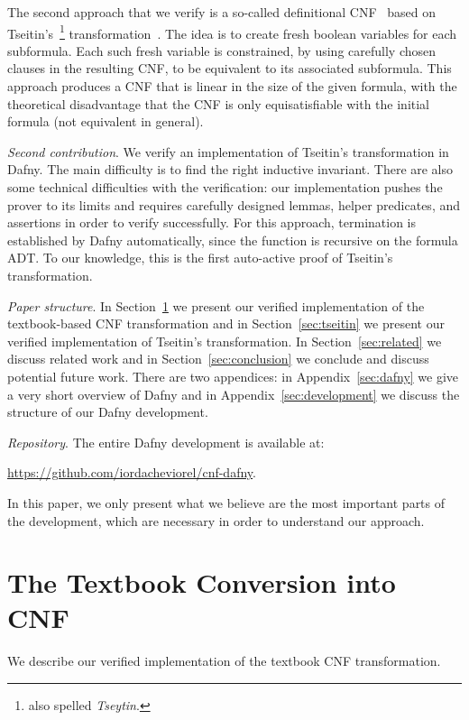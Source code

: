 \documentclass[12pt]{report}
\begin{document}
The second approach that we verify is a so-called definitional
CNF~\cite{harrison} based on Tseitin's~\footnote{also spelled
  \emph{Tseytin}.}  transformation~\cite{Tseitin}. The idea is to
create fresh boolean variables for each subformula. Each such fresh
variable is constrained, by using carefully chosen clauses in the
resulting CNF, to be equivalent to its associated subformula. This
approach produces a CNF that is linear in the size of the given
formula, with the theoretical disadvantage that the CNF is only
equisatisfiable with the initial formula (not equivalent in general).

\emph{Second contribution}. We verify an implementation of Tseitin’s
transformation in Dafny. The main difficulty is to find the right
inductive invariant. There are also some technical difficulties with
the verification: our implementation pushes the prover to its limits
and requires carefully designed lemmas, helper predicates, and
assertions in order to verify successfully. For this approach,
termination is established by Dafny automatically, since the function
is recursive on the formula ADT. To our knowledge, this is the first
auto-active proof of Tseitin's transformation.

\emph{Paper structure}. In Section~\ref{sec:textbook} we present our
verified implementation of the textbook-based CNF transformation and
in Section~\ref{sec:tseitin} we present our verified implementation of
Tseitin's transformation. In Section~\ref{sec:related} we discuss
related work and in Section~\ref{sec:conclusion} we conclude and
discuss potential future work. There are two appendices: in
Appendix~\ref{sec:dafny} we give a very short overview of Dafny and in
Appendix~\ref{sec:development} we discuss the structure of our Dafny
development.

\emph{Repository}. The entire Dafny development is available at: 
\begin{center}\url{https://github.com/iordacheviorel/cnf-dafny}.\end{center}
In this paper, we only present what we believe are the most important
parts of the development, which are necessary in order to understand
our approach.

\section{The Textbook Conversion into CNF}
\label{sec:textbook}

We describe our verified implementation of the textbook CNF
transformation.
\end{document}
